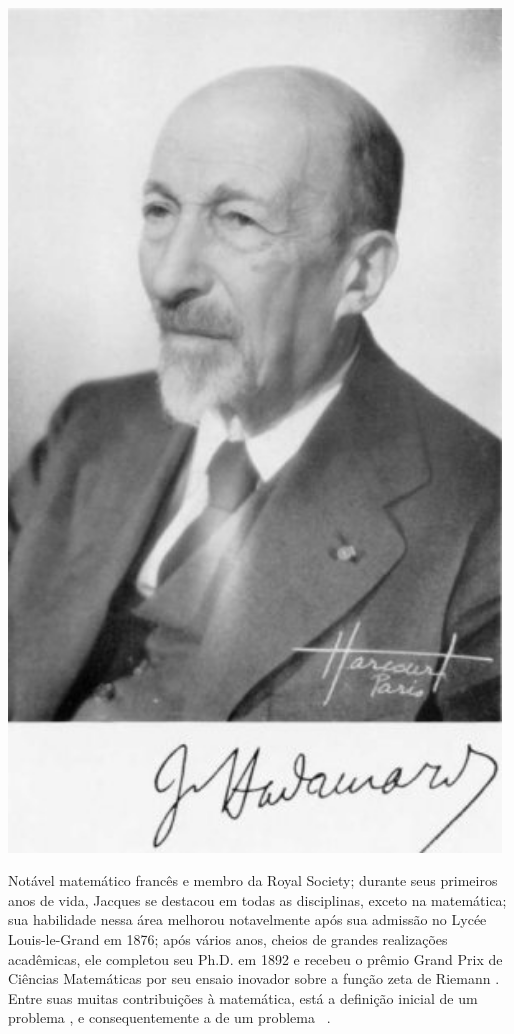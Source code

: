 \begin{elaboracion}[title=Jacques Salomon Hadamard (1865-1963), width= 0.99\linewidth]
\label{elab:Hadamard}
\noindent
\begin{minipage}{0.2\linewidth}
\centering
\includegraphics[width=0.98\textwidth]{chapters/notacao/Hadamard2.jpg}
\end{minipage}
\begin{minipage}{0.8\linewidth}
Notável matemático francês  e membro da Royal Society;
durante seus primeiros anos de vida, 
Jacques se destacou em todas as disciplinas, exceto na matemática;
sua habilidade nessa área melhorou notavelmente após sua admissão no Lycée Louis-le-Grand em 1876;
após vários anos, cheios de  grandes realizações acadêmicas, ele completou seu Ph.D. em 1892 
e recebeu o prêmio Grand Prix de Ciências Matemáticas por seu ensaio inovador sobre a função zeta de Riemann
\cite[pp. 326]{agarwal2014creators}.
Entre suas muitas contribuições à matemática, está a definição inicial de um problema \wellposed,
e consequentemente a de um problema \illposed~\cite[pp. 9, 132]{p2011well}.
\end{minipage}
\end{elaboracion}

